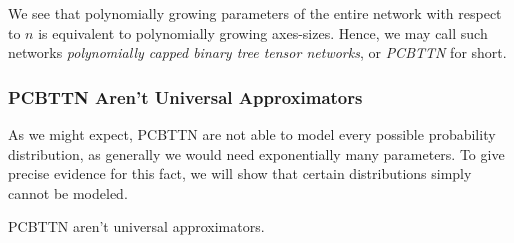 \documentclass[../../main.tex]{subfiles}
\begin{document}
    We see that polynomially growing parameters of the entire network with respect to $n$ is equivalent to polynomially growing axes-sizes. Hence, we may call such networks \emph{polynomially capped binary tree tensor networks}, or \emph{PCBTTN} for short.

    \subsubsection{PCBTTN Aren't Universal Approximators}
    As we might expect, PCBTTN are not able to model every possible probability distribution, as generally we would need exponentially many parameters. To give precise evidence for this fact, we will show that certain distributions simply cannot be modeled.

    \begin{theorem}
        PCBTTN aren't universal approximators.
    \end{theorem}
\end{document}
